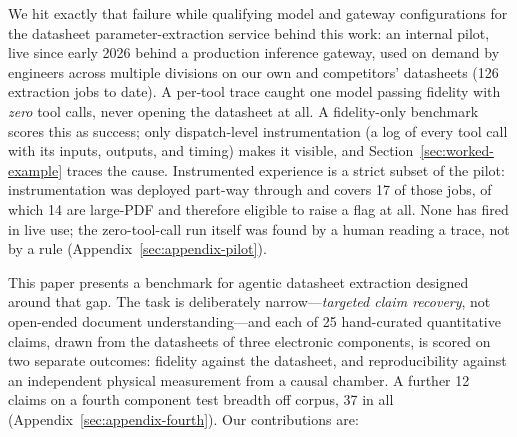 \documentclass[11pt]{article}
\begin{document}
We hit exactly that failure while qualifying model and gateway
configurations for the datasheet parameter-extraction service behind
this work: an internal pilot, live since early 2026 behind a production
inference gateway, used on demand by engineers across multiple
divisions on our own and competitors' datasheets (126 extraction jobs to
date). A per-tool trace caught one model passing fidelity with
\emph{zero} tool calls, never opening the datasheet at all. A
fidelity-only benchmark scores this as success; only dispatch-level
instrumentation (a log of every tool call with its inputs, outputs, and
timing) makes it visible, and Section~\ref{sec:worked-example} traces
the cause. Instrumented experience is a strict subset of the pilot:
instrumentation was deployed part-way through and covers 17 of those
jobs, of which 14 are large-PDF and therefore eligible to raise a flag
at all. None has fired in live use; the zero-tool-call run itself was
found by a human reading a trace, not by a rule
(Appendix~\ref{sec:appendix-pilot}).

This paper presents a benchmark for agentic datasheet extraction
designed around that gap. The task is deliberately
narrow---\emph{targeted claim recovery}, not open-ended document
understanding---and each of 25 hand-curated quantitative claims, drawn
from the datasheets of three electronic components, is scored
on two separate outcomes: fidelity against the datasheet, and
reproducibility against an independent physical measurement from a
causal chamber. A further 12 claims on a fourth component test breadth
off corpus, 37 in all (Appendix~\ref{sec:appendix-fourth}). Our
contributions are:
\end{document}
